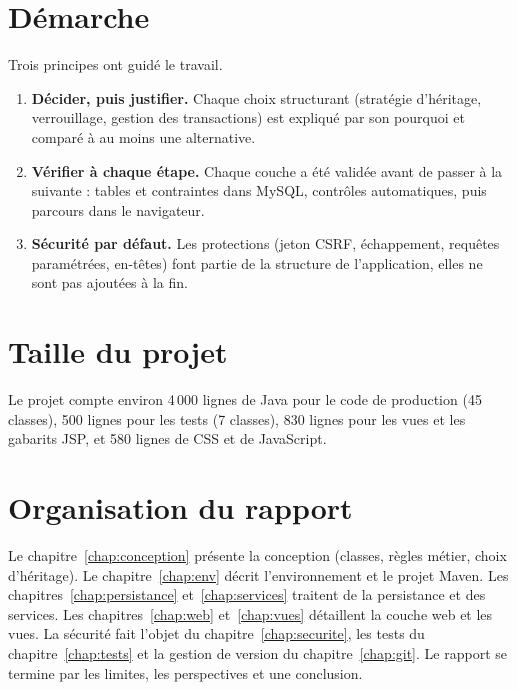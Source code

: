 \section{Démarche}
Trois principes ont guidé le travail.
\begin{enumerate}
  \item \textbf{Décider, puis justifier.} Chaque choix structurant (stratégie d'héritage, verrouillage, gestion des
        transactions) est expliqué par son pourquoi et comparé à au moins une alternative.
  \item \textbf{Vérifier à chaque étape.} Chaque couche a été validée avant de passer à la suivante : tables et
        contraintes dans MySQL, contrôles automatiques, puis parcours dans le navigateur.
  \item \textbf{Sécurité par défaut.} Les protections (jeton CSRF, échappement, requêtes paramétrées, en-têtes) font
        partie de la structure de l'application, elles ne sont pas ajoutées à la fin.
\end{enumerate}

\section{Taille du projet}
Le projet compte environ 4\,000 lignes de Java pour le code de production (45 classes), 500 lignes pour les
tests (7 classes), 830 lignes pour les vues et les gabarits JSP, et 580 lignes de CSS et de JavaScript.

\section{Organisation du rapport}
Le chapitre~\ref{chap:conception} présente la conception (classes, règles métier, choix d'héritage). Le
chapitre~\ref{chap:env} décrit l'environnement et le projet Maven. Les chapitres~\ref{chap:persistance}
et~\ref{chap:services} traitent de la persistance et des services. Les chapitres~\ref{chap:web} et~\ref{chap:vues}
détaillent la couche web et les vues. La sécurité fait l'objet du chapitre~\ref{chap:securite}, les tests du
chapitre~\ref{chap:tests} et la gestion de version du chapitre~\ref{chap:git}. Le rapport se termine par les
limites, les perspectives et une conclusion.
